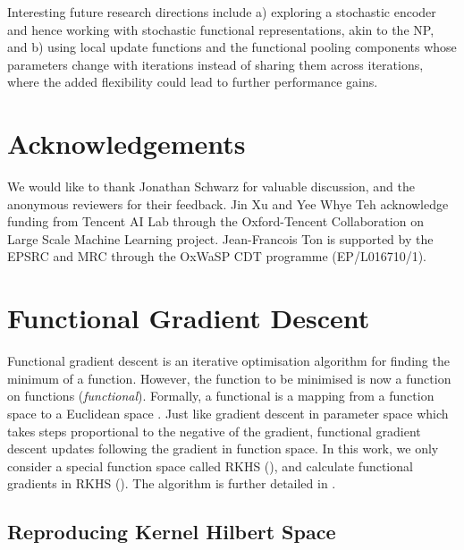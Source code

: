 \documentclass{article}
\theoremstyle{definition}
\begin{document}
Interesting future research directions include
a) exploring a stochastic encoder and hence working with stochastic functional representations, akin to the \gls{NP},
and b) using local update functions and the functional pooling components whose parameters change with iterations instead of sharing them across iterations, where the added flexibility could lead to further performance gains.

\section*{Acknowledgements}

We would like to thank Jonathan Schwarz for valuable discussion, and the anonymous reviewers for their feedback. Jin Xu and Yee Whye Teh acknowledge funding from Tencent AI Lab through the Oxford-Tencent Collaboration on Large Scale Machine Learning project. Jean-Francois Ton is supported by the EPSRC and MRC through the OxWaSP CDT programme (EP/L016710/1). 

\clearpage
\newpage






\onecolumn
{}

\appendix 

\section{Functional Gradient Descent}

Functional gradient descent \citep{mason1999functional,guo2001norm} is an iterative optimisation algorithm for finding the minimum of a function. However, the function to be minimised is now a function on functions (\emph{functional}). Formally, a functional  is a mapping from a function space  to a  Euclidean space .
Just like gradient descent in parameter space which takes steps proportional to the negative of the gradient, functional gradient descent updates  following the gradient in function space. In this work, we only consider a special function space called \gls{RKHS} (), and calculate functional gradients in \gls{RKHS} (). The algorithm is further detailed in .

\subsection{Reproducing Kernel Hilbert Space} \label{sub:rkhs}
\end{document}
